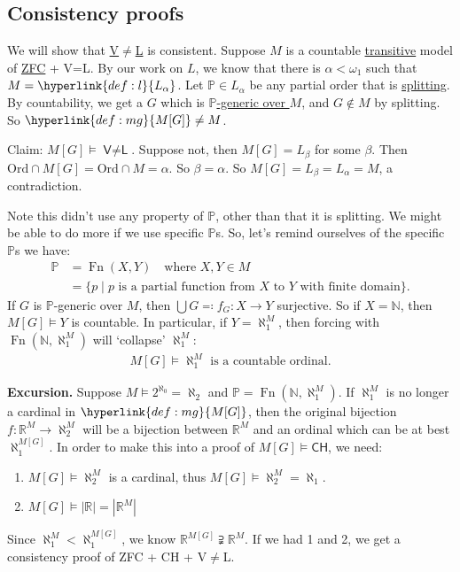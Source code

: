 \documentclass{article}
\newcommand{\p}{\mathbb{P}}
\newcommand{\1}{\mathbbm{1}}
\let\models\vDash
\begin{document}
\subsection{Consistency proofs}
\newlec
We will show that \hyperlink{def:vl}{\textsf{V$\neq$L}} is consistent.
Suppose $M$ is a countable \hyperlink{def:transitive}{transitive} model of \hyperlink{def:axioms}{\textsf{ZFC}} + \textsf{V=L}.
By our work on $L$, we know that there is $\alpha < \omega_1$ such that $M = \hyperlink{def:l}{L_\alpha}$.
Let $\mathbb{P} \in L_\alpha$ be any partial order that is \hyperlink{def:splitting}{splitting}.
By countability, we get a $G$ which is \hyperlink{def:genericO}{$\p$-generic over $M$}, and $G \notin M$ by splitting.
So $\hyperlink{def:mg}{M[G]} \neq M$.

Claim: $M[G] \models \textsf{V$\neq$L}$. Suppose not, then $M[G] = L_\beta$ for some $\beta$. Then $\text{Ord} \cap M[G] = \text{Ord} \cap M = \alpha$.
So $\beta = \alpha$. So $M[G] = L_\beta = L_\alpha = M$, a contradiction.

Note this didn't use any property of $\p$, other than that it is splitting.
We might be able to do more if we use specific $\p$s.
So, let's remind ourselves of the specific $\p$s we have:
\begin{align*}
  \p &= \operatorname{Fn}(X,Y) \quad \text{where } X,Y \in M \\
     &= \{ p \mid p \text{ is a partial function from } X \text{ to } Y \text{ with finite domain}\}.
\end{align*}
If $G$ is $\mathbb{P}$-generic over $M$, then $\bigcup G \eqqcolon f_G: X \to Y$ surjective.
So if $X = \mathbb{N}$, then $M[G] \models Y$ is countable.
In particular, if $Y = \aleph_1^M$, then forcing with $\operatorname{Fn}(\mathbb{N},\aleph_1^M)$ will `collapse' $\aleph_1^M$:
\begin{align*}
  M[G] \models \aleph_1^M \text{ is a countable ordinal.}
\end{align*}

\textbf{Excursion.} Suppose $M \models 2^{\aleph_0} = \aleph_2$ and $\mathbb{P} = \operatorname{Fn}(\mathbb{N},\aleph_1^M)$.
If $\aleph_1^M$ is no longer a cardinal in $\hyperlink{def:mg}{M[G]}$, then the original bijection $f: \mathbb{R}^M \to \aleph_2^M$ will be a bijection between $\mathbb{R}^M$ and an ordinal which can be at best $\aleph_1^{M[G]}$.
In order to make this into a proof of $M[G] \models \textsf{CH}$, we need:
\begin{enumerate}
  \item $M[G] \models \aleph_2^M$ is a cardinal, thus $M[G] \models \aleph_2^M = \aleph_1$.
  \item $M[G] \models |\mathbb{R}| = |\mathbb{R}^M|$
\end{enumerate}
Since $\aleph_1^M < \aleph_1^{M[G]}$, we know $\mathbb{R}^{M[G]} \supsetneqq \mathbb{R}^M$.
If we had 1 and 2, we get a consistency proof of \textsf{ZFC} + \textsf{CH} + \textsf{V$\neq$L}.
\end{document}
